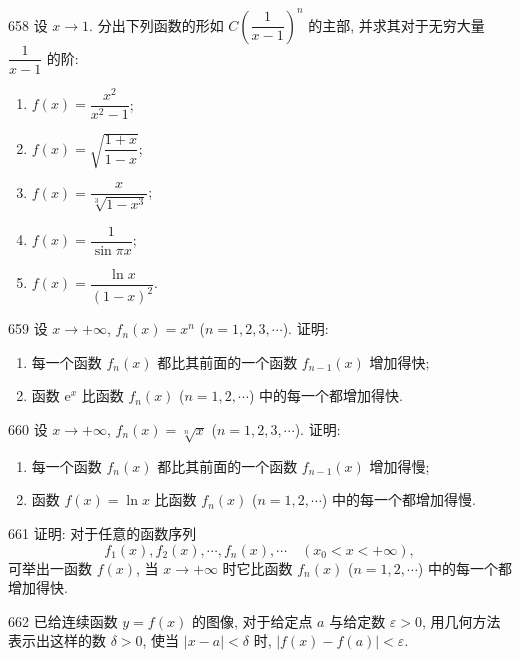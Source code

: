 \begin{prob}[L]{658}
设 $x \to 1$. 分出下列函数的形如 $C\left(\dfrac{1}{x - 1}\right)^n$ 的主部, 并求其对于无穷大量 $\dfrac{1}{x - 1}$ 的阶:
\begin{enumerate}[label=(\alph*), itemsep=2pt, topsep=3pt]
  \item $f(x) = \dfrac{x^2}{x^2 - 1}$;
  \item $f(x) = \sqrt{\dfrac{1 + x}{1 - x}}$;
  \item $f(x) = \dfrac{x}{\sqrt[3]{1 - x^3}}$;
  \item $f(x) = \dfrac{1}{\sin\pi x}$;
  \item $f(x) = \dfrac{\ln x}{(1 - x)^2}$.
\end{enumerate}
\end{prob}

\begin{prob}[M]{659}
设 $x \to +\infty$, $f_n(x) = x^n$ ($n = 1, 2, 3, \cdots$). 证明:
\begin{enumerate}[label=(\arabic*), itemsep=2pt, topsep=3pt]
  \item 每一个函数 $f_n(x)$ 都比其前面的一个函数 $f_{n-1}(x)$ 增加得快;
  \item 函数 $\mathrm{e}^x$ 比函数 $f_n(x)$ ($n = 1, 2, \cdots$) 中的每一个都增加得快.
\end{enumerate}
\end{prob}

\begin{prob}[M]{660}
设 $x \to +\infty$, $f_n(x) = \sqrt[n]{x}$ ($n = 1, 2, 3, \cdots$). 证明:
\begin{enumerate}[label=(\arabic*), itemsep=2pt, topsep=3pt]
  \item 每一个函数 $f_n(x)$ 都比其前面的一个函数 $f_{n-1}(x)$ 增加得慢;
  \item 函数 $f(x) = \ln x$ 比函数 $f_n(x)$ ($n = 1, 2, \cdots$) 中的每一个都增加得慢.
\end{enumerate}
\end{prob}

\begin{prob}[M]{661}
证明: 对于任意的函数序列
\[
  f_1(x), f_2(x), \cdots, f_n(x), \cdots \quad (x_0 < x < +\infty),
\]
可举出一函数 $f(x)$, 当 $x \to +\infty$ 时它比函数 $f_n(x)$ ($n = 1, 2, \cdots$) 中的每一个都增加得快.
\end{prob}


\begin{prob}[M]{662}
已给连续函数 $y = f(x)$ 的图像, 对于给定点 $a$ 与给定数 $\varepsilon > 0$, 用几何方法表示出这样的数 $\delta > 0$, 使当 $|x - a| < \delta$ 时, $|f(x) - f(a)| < \varepsilon$.
\end{prob}


